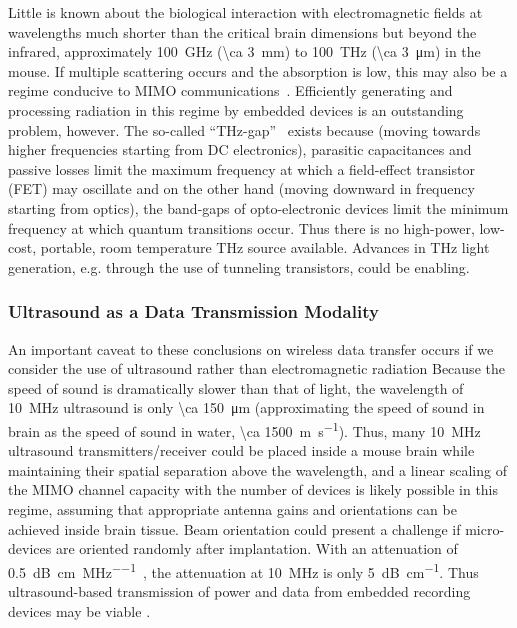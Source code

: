 Little is known about the biological interaction with electromagnetic fields at wavelengths much shorter than the critical brain dimensions but beyond the infrared, approximately \SI{100}{\giga\hertz} (\SI{\ca 3}{\milli\meter}) to \SI{100}{\tera\hertz} (\SI{\ca 3}{\micro\meter}) in the mouse.
If multiple scattering occurs and the absorption is low, this may also be a regime conducive to MIMO communications~\cite{bakopoulos09}.
Efficiently generating and processing radiation in this regime by embedded devices is an outstanding problem, however.
The so-called ``THz-gap''~\cite{tonouchi07} exists because (moving towards higher frequencies starting from DC electronics), parasitic capacitances and passive losses limit the maximum frequency at which a field-effect transistor (FET) may oscillate and on the other hand (moving downward in frequency starting from optics), the band-gaps of opto-electronic devices limit the minimum frequency at which quantum transitions occur.
Thus there is no high-power, low-cost, portable, room temperature \si{THz} source available.
Advances in \si{THz} light generation, e.g. through the use of tunneling transistors, could be enabling.

\subsubsection{Ultrasound as a Data Transmission Modality}
An important caveat to these conclusions on wireless data transfer occurs if we consider the use of ultrasound rather than electromagnetic radiation
Because the speed of sound is dramatically slower than that of light, the wavelength of \SI{10}{\mega\hertz} ultrasound is only \SI{\ca 150}{\micro\meter} (approximating the speed of sound in brain as the speed of sound in water, \SI{\ca 1500}{\meter\per\second}).
Thus, many \SI{10}{\mega\hertz} ultrasound transmitters/receiver could be placed inside a mouse brain while maintaining their spatial separation above the wavelength, and a linear scaling of the MIMO channel capacity with the number of devices is likely possible in this regime, assuming that appropriate antenna gains and orientations can be achieved inside brain tissue. Beam orientation could present a challenge if micro-devices are oriented randomly after implantation.
With an attenuation of \SI{0.5}{\dB\per\centi\meter\per\mega\hertz}~\cite{hoskins10}, the attenuation at \SI{10}{\mega\hertz} is only \SI{5}{\dB\per\centi\meter}.
Thus ultrasound-based transmission of power and data from embedded recording devices may be viable \cite{Seo2013}.

